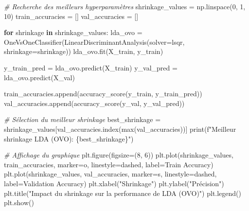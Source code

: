 \documentclass[
  letterpaper,
  DIV=11,
  numbers=noendperiod]{scrartcl}
\newenvironment{Shaded}{}{}
\newcommand{\BuiltInTok}[1]{\textcolor[rgb]{0.00,0.50,0.00}{#1}}
\newcommand{\CommentTok}[1]{\textcolor[rgb]{0.38,0.63,0.69}{\textit{#1}}}
\newcommand{\ControlFlowTok}[1]{\textcolor[rgb]{0.00,0.44,0.13}{\textbf{#1}}}
\newcommand{\DecValTok}[1]{\textcolor[rgb]{0.25,0.63,0.44}{#1}}
\newcommand{\KeywordTok}[1]{\textcolor[rgb]{0.00,0.44,0.13}{\textbf{#1}}}
\newcommand{\NormalTok}[1]{#1}
\newcommand{\OperatorTok}[1]{\textcolor[rgb]{0.40,0.40,0.40}{#1}}
\newcommand{\SpecialCharTok}[1]{\textcolor[rgb]{0.25,0.44,0.63}{#1}}
\newcommand{\SpecialStringTok}[1]{\textcolor[rgb]{0.73,0.40,0.53}{#1}}
\newcommand{\StringTok}[1]{\textcolor[rgb]{0.25,0.44,0.63}{#1}}
\begin{document}
\begin{Shaded}
\begin{Highlighting}[]
\CommentTok{\# Recherche des meilleurs hyperparamètres}
\NormalTok{shrinkage\_values }\OperatorTok{=}\NormalTok{ np.linspace(}\DecValTok{0}\NormalTok{, }\DecValTok{1}\NormalTok{, }\DecValTok{10}\NormalTok{)}
\NormalTok{train\_accuracies }\OperatorTok{=}\NormalTok{ []}
\NormalTok{val\_accuracies }\OperatorTok{=}\NormalTok{ []}

\ControlFlowTok{for}\NormalTok{ shrinkage }\KeywordTok{in}\NormalTok{ shrinkage\_values:}
\NormalTok{    lda\_ovo }\OperatorTok{=}\NormalTok{ OneVsOneClassifier(LinearDiscriminantAnalysis(solver}\OperatorTok{=}\StringTok{\textquotesingle{}lsqr\textquotesingle{}}\NormalTok{, shrinkage}\OperatorTok{=}\NormalTok{shrinkage))}
\NormalTok{    lda\_ovo.fit(X\_train, y\_train)}
    
\NormalTok{    y\_train\_pred }\OperatorTok{=}\NormalTok{ lda\_ovo.predict(X\_train)}
\NormalTok{    y\_val\_pred }\OperatorTok{=}\NormalTok{ lda\_ovo.predict(X\_val)}
    
\NormalTok{    train\_accuracies.append(accuracy\_score(y\_train, y\_train\_pred))}
\NormalTok{    val\_accuracies.append(accuracy\_score(y\_val, y\_val\_pred))}

\CommentTok{\# Sélection du meilleur shrinkage}
\NormalTok{best\_shrinkage }\OperatorTok{=}\NormalTok{ shrinkage\_values[val\_accuracies.index(}\BuiltInTok{max}\NormalTok{(val\_accuracies))]}
\BuiltInTok{print}\NormalTok{(}\SpecialStringTok{f"Meilleur shrinkage LDA (OVO): }\SpecialCharTok{\{}\NormalTok{best\_shrinkage}\SpecialCharTok{\}}\SpecialStringTok{"}\NormalTok{)}

\CommentTok{\# Affichage du graphique}
\NormalTok{plt.figure(figsize}\OperatorTok{=}\NormalTok{(}\DecValTok{8}\NormalTok{, }\DecValTok{6}\NormalTok{))}
\NormalTok{plt.plot(shrinkage\_values, train\_accuracies, marker}\OperatorTok{=}\StringTok{\textquotesingle{}o\textquotesingle{}}\NormalTok{, linestyle}\OperatorTok{=}\StringTok{\textquotesingle{}dashed\textquotesingle{}}\NormalTok{, label}\OperatorTok{=}\StringTok{\textquotesingle{}Train Accuracy\textquotesingle{}}\NormalTok{)}
\NormalTok{plt.plot(shrinkage\_values, val\_accuracies, marker}\OperatorTok{=}\StringTok{\textquotesingle{}s\textquotesingle{}}\NormalTok{, linestyle}\OperatorTok{=}\StringTok{\textquotesingle{}dashed\textquotesingle{}}\NormalTok{, label}\OperatorTok{=}\StringTok{\textquotesingle{}Validation Accuracy\textquotesingle{}}\NormalTok{)}
\NormalTok{plt.xlabel(}\StringTok{"Shrinkage"}\NormalTok{)}
\NormalTok{plt.ylabel(}\StringTok{"Précision"}\NormalTok{)}
\NormalTok{plt.title(}\StringTok{"Impact du shrinkage sur la performance de LDA (OVO)"}\NormalTok{)}
\NormalTok{plt.legend()}
\NormalTok{plt.show()}


\end{Highlighting}
\end{Shaded}
\end{document}
